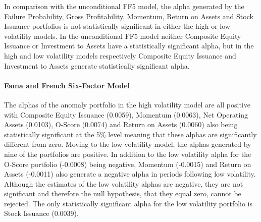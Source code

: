 \documentclass[12pt, a4paper, oneside]{article}
\begin{document}
In comparison with the unconditional FF5 model, the alpha generated by the Failure Probability, Gross Profitability, Momentum, Return on Assets and Stock Issuance portfolios is not statistically significant in either the high or low volatility models. In the unconditional FF5 model neither Composite Equity Issuance or Investment to Assets have a statistically significant alpha, but in the high and low volatility models respectively Composite Equity Issuance and Investment to Assets generate statistically significant alpha. 

\paragraph{Fama and French Six-Factor Model}
The alphas of the anomaly portfolio in the high volatility model are all positive with Composite Equity Issuance (0.0059), Momentum (0.0063), Net Operating Assets (0.0103), O-Score (0.0074) and Return on Assets (0.0060) also being statistically significant at the 5\% level meaning that these alphas are significantly different from zero. Moving to the low volatility model, the alphas generated by nine of the portfolios are positive. In addition to the low volatility alpha for the O-Score portfolio (-0.0008) being negative, Momentum (-0.0015) and Return on Assets (-0.0011) also generate a negative alpha in periods following low volatility. Although the estimates of the low volatility alphas are negative, they are not significant and therefore the null hypothesis, that they equal zero, cannot be rejected. The only statistically significant alpha for the low volatility portfolio is Stock Issuance (0.0039).
\end{document}
